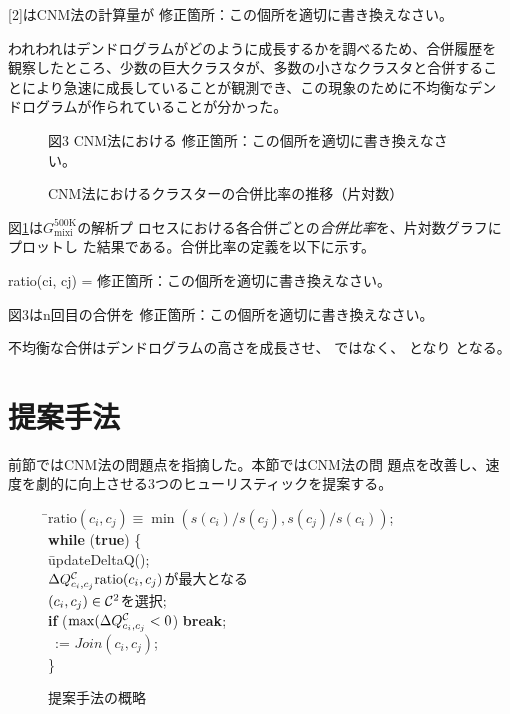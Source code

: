\documentclass [a4j,11pt] {jsarticle}
\begin{document}
\begin {空欄ブロック}{{}[2]はCNM法の計算量が}
修正箇所：この個所を適切に書き換えなさい。
\end {空欄ブロック}

われわれはデンドログラムがどのように成長するかを調べるため、合併履歴を
観察したところ、少数の巨大クラスタが、多数の小さなクラスタと合併するこ
とにより急速に成長していることが観測でき、この現象のために不均衡なデン
ドログラムが作られていることが分かった。

\begin{figure}[htbp]
\begin {空欄ブロック}{図3 CNM法における}
修正箇所：この個所を適切に書き換えなさい。
\end {空欄ブロック}
  \caption {CNM法におけるクラスターの合併比率の推移（片対数）}
  \label{fig: clauset ratio}
\end{figure}

図\ref {fig: clauset ratio}は$G_{\text {mixi}}^{\text {500K}}$の解析プ
ロセスにおける各合併ごとの\emph {合併比率}を、片対数グラフにプロットし
た結果である。合併比率の定義を以下に示す。

\begin {空欄ブロック}{ratio(ci, cj) =}
修正箇所：この個所を適切に書き換えなさい。
\end {空欄ブロック}

\begin {空欄ブロック}{図3はn回目の合併を}
修正箇所：この個所を適切に書き換えなさい。
\end {空欄ブロック}

不均衡な合併はデンドログラムの高さを成長させ、
ではなく、
となり
となる。


\section {提案手法}
\label {sect: algorithm}

前節ではCNM法の問題点を指摘した。本節ではCNM法の問
題点を改善し、速度を劇的に向上させる3つのヒューリスティックを提案する。

\begin {figure}
\begin {tabbing}
\hspace{.3\linewidth}\=$\mathrm {ratio}(c_i,c_j) \equiv \min(s(c_i)/s(c_j), s(c_j)/s(c_i))$; \\
\>\textbf {while} (\textbf {true}) \{\\
\>\quad\= updateDeltaQ(); \\
\>\>$\Delta Q^{{\cal C}}_{c_i,c_j}\mathrm {ratio}(c_i,c_j)$が最大となる\\
\>\>\quad $(c_i, c_j) \in {\cal C}^2$を選択;\\
\>\>\textbf {if} ($\max(\Delta Q^{{\cal C}}_{c_i,c_j} < 0$) \textbf {break};\\
\>\>\clustering\ := $\mathit {Join}(c_i, c_j)$;\\
\>\}
\end {tabbing}
  \caption {提案手法の概略}
  \label {fig: tw algorithm}
\end {figure}
\end{document}

